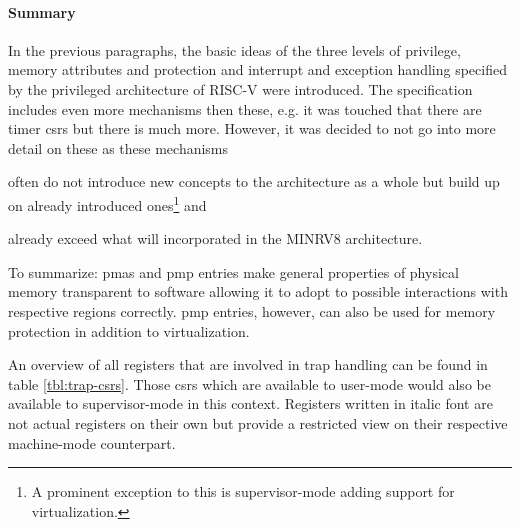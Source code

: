 \paragraph{Summary}
In the previous paragraphs, the basic ideas of the three levels of privilege, memory attributes and protection and interrupt and exception handling specified by the privileged architecture of RISC-V \cite{RiscVISAP} were introduced.
The specification includes even more mechanisms then these, e.g. it was touched that there are timer \glspl{csr} but there is much more.
However, it was decided to not go into more detail on these as these mechanisms \begin{enumerate*}[label=\alph*)]
    \item often do not introduce new concepts to the architecture as a whole but build up on already introduced ones\footnote{%
        A prominent exception to this is supervisor-mode adding support for virtualization.
    } and
    \item already exceed what will incorporated in the MINRV8 architecture.
\end{enumerate*}

To summarize:
\glspl{pma} and \gls{pmp} entries make general properties of physical memory transparent to software allowing it to adopt to possible interactions with respective regions correctly.
\gls{pmp} entries, however, can also be used for memory protection in addition to virtualization.

An overview of all registers that are involved in trap handling can be found in table \ref{tbl:trap-csrs}.
Those \glspl{csr} which are available to user-mode would also be available to supervisor-mode in this context.
Registers written in italic font are not actual registers on their own but provide a restricted view on their respective machine-mode counterpart.

